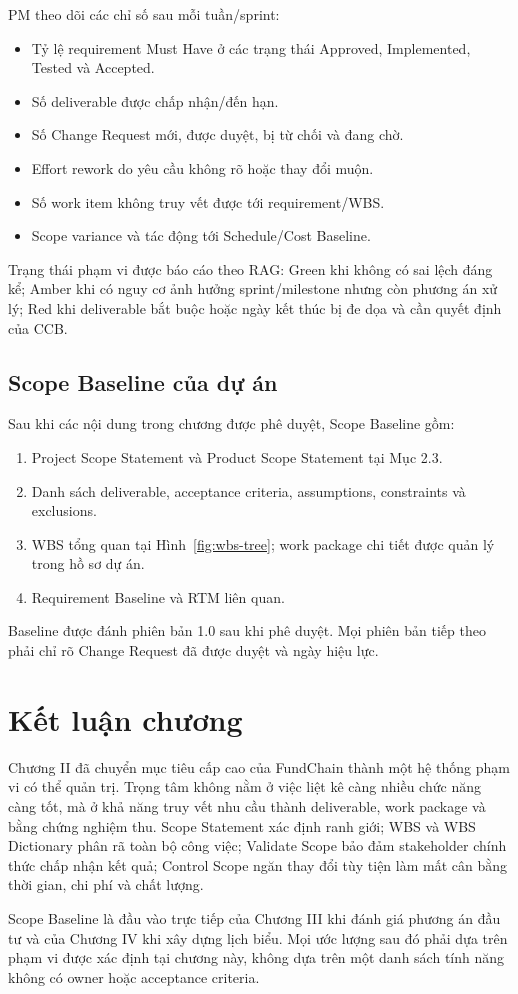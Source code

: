 PM theo dõi các chỉ số sau mỗi tuần/sprint:

\begin{itemize}
  \item Tỷ lệ requirement Must Have ở các trạng thái Approved, Implemented, Tested và Accepted.
  \item Số deliverable được chấp nhận/đến hạn.
  \item Số Change Request mới, được duyệt, bị từ chối và đang chờ.
  \item Effort rework do yêu cầu không rõ hoặc thay đổi muộn.
  \item Số work item không truy vết được tới requirement/WBS.
  \item Scope variance và tác động tới Schedule/Cost Baseline.
\end{itemize}

Trạng thái phạm vi được báo cáo theo RAG: Green khi không có sai lệch đáng kể; Amber khi có nguy cơ ảnh hưởng sprint/milestone nhưng còn phương án xử lý; Red khi deliverable bắt buộc hoặc ngày kết thúc bị đe dọa và cần quyết định của CCB.

\subsection{Scope Baseline của dự án}

Sau khi các nội dung trong chương được phê duyệt, Scope Baseline gồm:

\begin{enumerate}
  \item Project Scope Statement và Product Scope Statement tại Mục 2.3.
  \item Danh sách deliverable, acceptance criteria, assumptions, constraints và exclusions.
  \item WBS tổng quan tại Hình~\ref{fig:wbs-tree}; work package chi tiết được quản lý trong hồ sơ dự án.
  \item Requirement Baseline và RTM liên quan.
\end{enumerate}

Baseline được đánh phiên bản 1.0 sau khi phê duyệt. Mọi phiên bản tiếp theo phải chỉ rõ Change Request đã được duyệt và ngày hiệu lực.

\section{Kết luận chương}

Chương II đã chuyển mục tiêu cấp cao của FundChain thành một hệ thống phạm vi có thể quản trị. Trọng tâm không nằm ở việc liệt kê càng nhiều chức năng càng tốt, mà ở khả năng truy vết nhu cầu thành deliverable, work package và bằng chứng nghiệm thu. Scope Statement xác định ranh giới; WBS và WBS Dictionary phân rã toàn bộ công việc; Validate Scope bảo đảm stakeholder chính thức chấp nhận kết quả; Control Scope ngăn thay đổi tùy tiện làm mất cân bằng thời gian, chi phí và chất lượng.

Scope Baseline là đầu vào trực tiếp của Chương III khi đánh giá phương án đầu tư và của Chương IV khi xây dựng lịch biểu. Mọi ước lượng sau đó phải dựa trên phạm vi được xác định tại chương này, không dựa trên một danh sách tính năng không có owner hoặc acceptance criteria.

